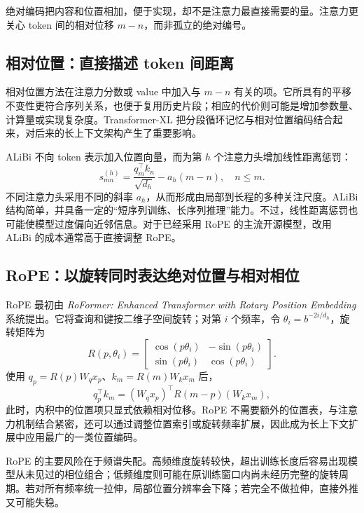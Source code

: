 \documentclass[UTF8,10pt,a4paper,fontset=none]{ctexart}
\begin{document}
绝对编码把内容和位置相加，便于实现，却不是注意力最直接需要的量。注意力更关心 token 间的相对位移 $m-n$，而非孤立的绝对编号。

\subsection{相对位置：直接描述 token 间距离}
相对位置方法在注意力分数或 value 中加入与 $m-n$ 有关的项。它所具有的平移不变性更符合序列关系，也便于复用历史片段；相应的代价则可能是增加参数量、计算量或实现复杂度。Transformer-XL 把分段循环记忆与相对位置编码结合起来\cite{dai2019transformerxl}，对后来的长上下文架构产生了重要影响。

ALiBi 不向 token 表示加入位置向量，而为第 $h$ 个注意力头增加线性距离惩罚\cite{press2021}：
\begin{equation}
s^{(h)}_{mn}=\frac{q_m^{\top}k_n}{\sqrt{d_h}}-a_h(m-n),\quad n\le m.
\end{equation}
不同注意力头采用不同的斜率 $a_h$，从而形成由局部到长程的多种关注尺度。ALiBi 结构简单，并具备一定的“短序列训练、长序列推理”能力。不过，线性距离惩罚也可能使模型过度偏向近邻信息。对于已经采用 RoPE 的主流开源模型，改用 ALiBi 的成本通常高于直接调整 RoPE。

\subsection{RoPE：以旋转同时表达绝对位置与相对相位}
RoPE 最初由 \textit{RoFormer: Enhanced Transformer with Rotary Position Embedding} 系统提出\cite{su2021}。它将查询和键按二维子空间旋转；对第 $i$ 个频率，令 $\theta_i=b^{-2i/d_h}$，旋转矩阵为
\begin{equation}
R(p,\theta_i)=\begin{bmatrix}
\cos(p\theta_i)&-\sin(p\theta_i)\\
\sin(p\theta_i)& \cos(p\theta_i)
\end{bmatrix}.
\end{equation}
使用 $q_p=R(p)W_qx_p$、$k_m=R(m)W_kx_m$ 后，
\begin{equation}
q_p^{\top}k_m=(W_qx_p)^{\top}R(m-p)(W_kx_m),
\end{equation}
此时，内积中的位置项只显式依赖相对位移。RoPE 不需要额外的位置表，与注意力机制结合紧密，还可以通过调整位置索引或旋转频率扩展，因此成为长上下文扩展中应用最广的一类位置编码。

RoPE 的主要风险在于频谱失配。高频维度旋转较快，超出训练长度后容易出现模型从未见过的相位组合；低频维度则可能在原训练窗口内尚未经历完整的旋转周期。若对所有频率统一拉伸，局部位置分辨率会下降；若完全不做拉伸，直接外推又可能失稳。
\end{document}
